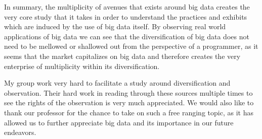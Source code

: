 \documentclass[sigconf]{acmart}
\begin{document}
In summary, the multiplicity of avenues that exists around big data creates the very core study that it takes in order to understand the practices and exhibits which are induced by the use of big data itself. By observing real world applications of big data we can see that the diversification of big data does not need to be mellowed or shallowed out from the perspective of a programmer, as it seems that the market capitalizes on big data and therefore creates the very enterprise of multiplicity within its diversification. 

\begin{acks}

My group work very hard to facilitate a study around diversification and observation. Their hard work in reading through these sources multiple times to see the rights of the observation is very much appreciated. We would also like to thank our professor for the chance to take on such a free ranging topic, as it has allowed us to further appreciate big data and its importance in our future endeavors.  

\end{acks}


 
\end{document}
